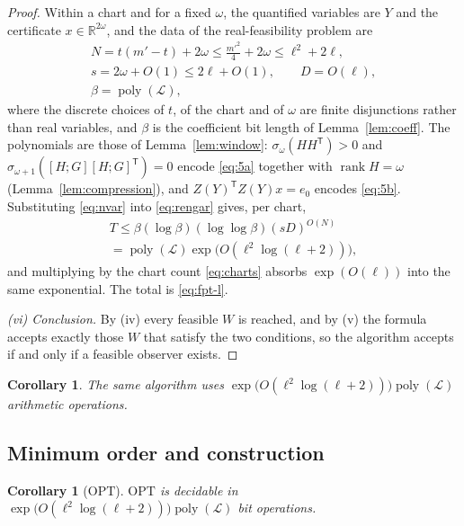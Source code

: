 \documentclass[journal]{IEEEtran}
\theoremstyle{plainn}
\newtheorem{cor}[thm]{Corollary}
\theoremstyle{remark}
\begin{document}
\begin{proof}
Within a chart and for a fixed $\omega$, the quantified variables are $Y$ and the certificate
$x\in\mathbb R^{2\omega}$, and the data of the real-feasibility problem are
\begin{equation}\label{eq:nvar}
\begin{gathered}
N=t(m'-t)+2\omega\le\tfrac{m'^2}{4}+2\omega\le\ell^2+2\ell,\\
s=2\omega+O(1)\le2\ell+O(1),\qquad D=O(\ell),\\
\beta=\operatorname{poly}(\mathcal L),
\end{gathered}
\end{equation}
where the discrete choices of $t$, of the chart and of $\omega$ are finite disjunctions rather
than real variables, and $\beta$ is the coefficient bit length of Lemma~\ref{lem:coeff}. The
polynomials are those of Lemma~\ref{lem:window}: $\sigma_\omega(HH^{\mathsf T})>0$ and
$\sigma_{\omega+1}([H;G][H;G]^{\mathsf T})=0$ encode \eqref{eq:5a} together with
$\operatorname{rank}H=\omega$ (Lemma~\ref{lem:compression}), and
$Z(Y)^{\mathsf T}Z(Y)x=e_0$ encodes \eqref{eq:5b}. Substituting \eqref{eq:nvar} into \eqref{eq:rengar} gives, per
chart,
\begin{equation*}
\begin{gathered}
T\le\beta(\log\beta)(\log\log\beta)(sD)^{O(N)}\\
=\operatorname{poly}(\mathcal L)\exp\bigl(O(\ell^2\log(\ell+2))\bigr),
\end{gathered}
\end{equation*}
and multiplying by the chart count \eqref{eq:charts} absorbs $\exp(O(\ell))$ into the same
exponential. The total is \eqref{eq:fpt-l}.

\emph{(vi) Conclusion.} By (iv) every feasible $W$ is reached, and by (v) the formula accepts exactly
those $W$ that satisfy the two conditions, so the algorithm accepts if and only if a feasible observer
exists.
\end{proof}

\begin{cor}\label{cor:arith}
The same algorithm uses $\exp\bigl(O(\ell^2\log(\ell+2))\bigr)\operatorname{poly}(\mathcal L)$
arithmetic operations.
\end{cor}

\subsection{Minimum order and construction}\label{sec:optfind}

\begin{cor}[$\mathrm{OPT}$]\label{cor:opt}
$\mathrm{OPT}$ is decidable in $\exp\bigl(O(\ell^2\log(\ell+2))\bigr)\operatorname{poly}(\mathcal L)$
bit operations.
\end{cor}
\end{document}
